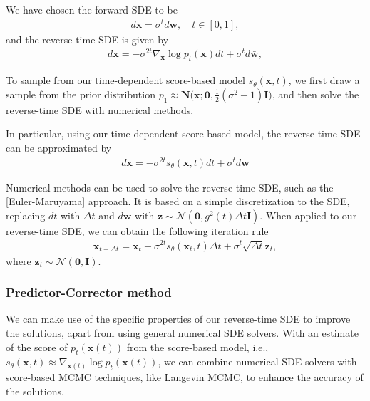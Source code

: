 \documentclass{article}
\begin{document}
We have chosen the forward SDE to be
\begin{align*}
d \mathbf{x} = \sigma^t d\mathbf{w}, \quad t\in[0,1],
\end{align*}
and the reverse-time SDE is given by
\begin{align*}
d\mathbf{x} = -\sigma^{2t} \nabla_\mathbf{x} \log p_t(\mathbf{x}) dt + \sigma^t d \bar{\mathbf{w}},
\end{align*}

To sample from our time-dependent score-based model \(s_\theta(\mathbf{x}, t)\), we first draw a sample from the prior distribution \(p_1 \approx \mathbf{N}\bigg(\mathbf{x}; \mathbf{0}, \frac{1}{2}(\sigma^{2} - 1) \mathbf{I}\bigg)\), and then solve the reverse-time SDE with numerical methods.

In particular, using our time-dependent score-based model, the reverse-time SDE can be approximated by
\begin{align*}
d\mathbf{x} = -\sigma^{2t} s_\theta(\mathbf{x}, t) dt + \sigma^t d \bar{\mathbf{w}}
\end{align*}

Numerical methods can be used to solve the reverse-time SDE, such as the [Euler-Maruyama] approach. It is based on a simple discretization to the SDE, replacing \(dt\) with \(\Delta t\) and \(d \mathbf{w}\) with \(\mathbf{z} \sim \mathcal{N}(\mathbf{0}, g^2(t) \Delta t \mathbf{I})\). When applied to our reverse-time SDE, we can obtain the following iteration rule
\begin{align}
\mathbf{x}_{t-\Delta t} = \mathbf{x}_t + \sigma^{2t} s_\theta(\mathbf{x}_t, t)\Delta t + \sigma^t\sqrt{\Delta t} \mathbf{z}_t,
\end{align}
where \(\mathbf{z}_t \sim \mathcal{N}(\mathbf{0}, \mathbf{I})\).
\subsubsection{Predictor-Corrector method}
We can make use of the specific properties of our reverse-time SDE to improve the solutions, apart from using general numerical SDE solvers. With an estimate of the score of $p_t(\mathbf{x}(t))$ from the score-based model, i.e., $s_\theta(\mathbf{x}, t) \approx \nabla_{\mathbf{x}(t)} \log p_t(\mathbf{x}(t))$, we can combine numerical SDE solvers with score-based MCMC techniques, like Langevin MCMC, to enhance the accuracy of the solutions.
\end{document}
